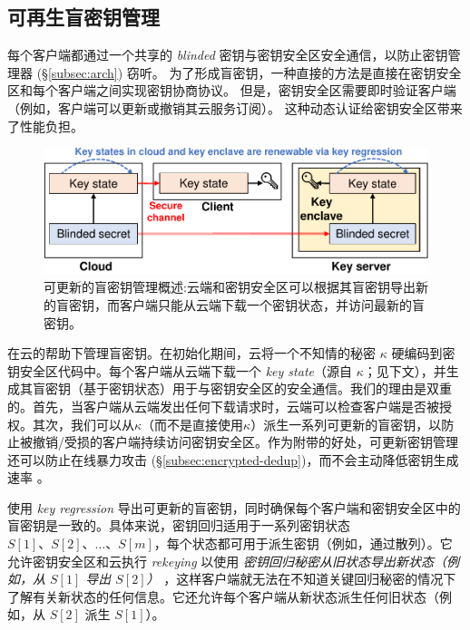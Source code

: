 \subsection{可再生盲密钥管理}
\label{subsec:key-management}

每个客户端都通过一个共享的 \textit{ blinded} 密钥与密钥安全区安全通信，以防止密钥管理器 (\S\ref{subsec:arch}) 窃听。 为了形成盲密钥，一种直接的方法是直接在密钥安全区和每个客户端之间实现密钥协商协议。 但是，密钥安全区需要即时验证客户端（例如，客户端可以更新或撤销其云服务订阅）。 这种动态认证给密钥安全区带来了性能负担。


\begin{figure}[t]
\centering
\includegraphics[width=\textwidth]{pic/sgxdedup/blindkey.pdf}
\vspace{-16pt}
\caption{可更新的盲密钥管理概述:云端和密钥安全区可以根据其盲密钥导出新的盲密钥，而客户端只能从云端下载一个密钥状态，并访问最新的盲密钥。}
\label{fig:keymanage}
\end{figure}

\sysname 在云的帮助下管理盲密钥。在初始化期间，云将一个不知情的秘密 $\kappa$ 硬编码到密钥安全区代码中。每个客户端从云端下载一个 \textit{ key state}（源自 $\kappa$；见下文），并生成其盲密钥（基于密钥状态）用于与密钥安全区的安全通信。我们的理由是双重的。首先，当客户端从云端发出任何下载请求时，云端可以检查客户端是否被授权。其次，我们可以从$\kappa$（而不是直接使用$\kappa$）派生一系列可更新的盲密钥，以防止被撤销/受损的客户端持续访问密钥安全区。作为附带的好处，可更新密钥管理还可以防止在线暴力攻击 (\S\ref{subsec:encrypted-dedup})，而不会主动降低密钥生成速率 \cite{bellare13b}。

\sysname 使用 \textit{ key regression} \cite{fu06} 导出可更新的盲密钥，同时确保每个客户端和密钥安全区中的盲密钥是一致的。具体来说，密钥回归适用于一系列密钥状态 $S[1]、S[2]、\ldots、S[m]$，每个状态都可用于派生密钥（例如，通过散列）。它允许密钥安全区和云执行 \textit{ rekeying} 以使用 \textit{ 密钥回归秘密从旧状态导出新状态（例如，从 $S[1]$ 导出 $S[2]$） }，这样客户端就无法在不知道关键回归秘密的情况下了解有关新状态的任何信息。它还允许每个客户端从新状态派生任何旧状态（例如，从 $S[2]$ 派生 $S[1]$）。

